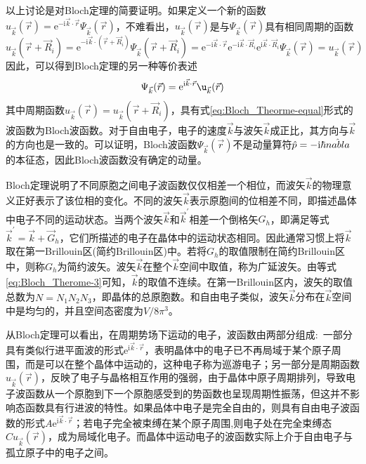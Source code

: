 以上讨论是对Bloch定理的简要证明。如果定义一个新的函数$u_{\vec k}(\vec r)=\mathrm{e}^{-\mathrm{i}\vec k\cdot\vec r}\Psi_{\vec k}(\vec r)$，不难看出，$u_{\vec k}(\vec r)$是与$\Psi_{\vec k}(\vec r)$具有相同周期的函数
\begin{displaymath}
	u_{\vec k}(\vec r+\vec R_i)=\mathrm{e}^{-\mathrm{i}\vec k\cdot(\vec r+\vec R_i)}\Psi_{\vec k}(\vec r+\vec R_i)=\mathrm{e}^{-\mathrm{i}\vec k\cdot\vec r}\mathrm{e}^{-\mathrm{i}\vec k\cdot\vec R_i}\mathrm{e}^{\mathrm{i}\vec k\cdot\vec R_i}\Psi_{\vec k}(\vec r)=u_{\vec k}(\vec r)
\end{displaymath}
因此，可以得到Bloch定理的另一种等价表述
\begin{equation}
	\Psi_{\vec k}(\vec r)=\mathrm{e}^{\mathrm{i}\vec k\cdot\vec r}\u_{\vec k}(\vec r)
	\label{eq:Bloch_Theorme-equal}
\end{equation}
其中周期函数$u_{\vec k}(\vec r)=u_{\vec k}(\vec r+\vec R_i)$，具有式\eqref{eq:Bloch_Theorme-equal}形式的波函数为Bloch波函数。对于自由电子，电子的速度$\vec k$与波矢$\vec k$成正比，其方向与$\vec k$的方向也是一致的。可以证明，Bloch波函数$\Psi_{\vec k}(\vec r)$不是动量算符$\hat p=-\mathrm{i}\hbar\hat{\\nabla}$的本征态，因此Bloch波函数没有确定的动量。

Bloch定理说明了不同原胞之间电子波函数仅仅相差一个相位，而波矢$\vec k$的物理意义正好表示了该位相的变化。不同的波矢$\vec k$表示原胞间的位相差不同，即描述晶体中电子不同的运动状态。当两个波矢$\vec k$和$\vec k^{\prime}$相差一个倒格矢$G_h$，即满足等式$\vec k^{\prime}=\vec k+\vec G_h$，它们所描述的电子在晶体中的运动状态相同。因此通常习惯上将$\vec k$取在第一Brillouin区(简约Brillouin区)中。若将$G_h$的取值限制在简约Brillouin区中，则称$G_h$为简约波矢。波矢$\vec k$在整个$\vec k$空间中取值，称为广延波矢。由等式\eqref{eq:Bloch_Therome-3}可知，$\vec k$的取值不连续。在第一Brillouin区内，波矢的取值总数为$N=N_1N_2N_3$，即晶体的总原胞数。和自由电子类似，波矢$\vec k$分布在$\vec k$空间中是均匀的，并且空间态密度为$V/8\pi^3$。

从Bloch定理可以看出，在周期势场下运动的电子，波函数由两部分组成:~一部分具有类似行进平面波的形式$\mathrm{e}^{\mathrm{i}\vec k\cdot\vec r}$，表明晶体中的电子已不再局域于某个原子周围，而是可以在整个晶体中运动的，这种电子称为巡游电子；另一部分是周期函数$u_{\vec k}(\vec r)$，反映了电子与晶格相互作用的强弱，由于晶体中原子周期排列，导致电子波函数从一个原胞到下一个原胞感受到的势函数也呈现周期性振荡，但这并不影响态函数具有行进波的特性。如果品体中电子是完全自由的，则具有自由电子波函数的形式$A\mathrm{e}^{\mathrm{i}\vec k\cdot\vec r}$；若电子完全被束缚在某个原子周围,则电子处在完全束缚态$Cu_{\vec k}(\vec r)$，成为局域化电子。而晶体中运动电子的波函数实际上介于自由电子与孤立原子中的电子之间。

